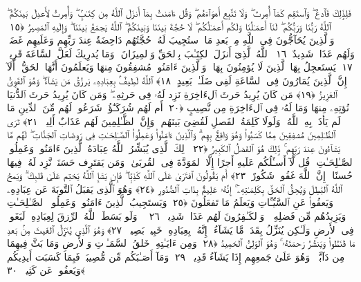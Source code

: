  فَلِذَٟلِكَ فَٱدعُ ۖ وَٱستَقِم كَمَآ أُمِرتَ ۖ وَلَا تَتَّبِع أَهوَآءَهُم ۖ وَقُل ءَامَنتُ بِمَآ أَنزَلَ ٱللَّهُ مِن كِتَـٰبٍۢ ۖ وَأُمِرتُ لِأَعدِلَ بَينَكُمُ ۖ ٱللَّهُ رَبُّنَا وَرَبُّكُم ۖ لَنَآ أَعمَـٰلُنَا وَلَكُم أَعمَـٰلُكُم ۖ لَا حُجَّةَ بَينَنَا وَبَينَكُمُ ۖ ٱللَّهُ يَجمَعُ بَينَنَا ۖ وَإِلَيهِ ٱلمَصِيرُ ﴿١٥﴾
 وَٱلَّذِينَ يُحَآجُّونَ فِى ٱللَّهِ مِنۢ بَعدِ مَا ٱستُجِيبَ لَهُۥ حُجَّتُهُم دَاحِضَةٌ عِندَ رَبِّهِم وَعَلَيهِم غَضَبٌۭ وَلَهُم عَذَابٌۭ شَدِيدٌ ﴿١٦﴾
 ٱللَّهُ ٱلَّذِىٓ أَنزَلَ ٱلكِتَـٰبَ بِٱلحَقِّ وَٱلمِيزَانَ ۗ وَمَا يُدرِيكَ لَعَلَّ ٱلسَّاعَةَ قَرِيبٌۭ ﴿١٧﴾
 يَستَعجِلُ بِهَا ٱلَّذِينَ لَا يُؤمِنُونَ بِهَا ۖ وَٱلَّذِينَ ءَامَنُوا۟ مُشفِقُونَ مِنهَا وَيَعلَمُونَ أَنَّهَا ٱلحَقُّ ۗ أَلَآ إِنَّ ٱلَّذِينَ يُمَارُونَ فِى ٱلسَّاعَةِ لَفِى ضَلَـٰلٍۭ بَعِيدٍ ﴿١٨﴾
 ٱللَّهُ لَطِيفٌۢ بِعِبَادِهِۦ يَرزُقُ مَن يَشَآءُ ۖ وَهُوَ ٱلقَوِىُّ ٱلعَزِيزُ ﴿١٩﴾
 مَن كَانَ يُرِيدُ حَرثَ ٱلءَاخِرَةِ نَزِد لَهُۥ فِى حَرثِهِۦ ۖ وَمَن كَانَ يُرِيدُ حَرثَ ٱلدُّنيَا نُؤتِهِۦ مِنهَا وَمَا لَهُۥ فِى ٱلءَاخِرَةِ مِن نَّصِيبٍ ﴿٢٠﴾
 أَم لَهُم شُرَكَـٰٓؤُا۟ شَرَعُوا۟ لَهُم مِّنَ ٱلدِّينِ مَا لَم يَأذَنۢ بِهِ ٱللَّهُ ۚ وَلَولَا كَلِمَةُ ٱلفَصلِ لَقُضِىَ بَينَهُم ۗ وَإِنَّ ٱلظَّـٰلِمِينَ لَهُم عَذَابٌ أَلِيمٌۭ ﴿٢١﴾
 تَرَى ٱلظَّـٰلِمِينَ مُشفِقِينَ مِمَّا كَسَبُوا۟ وَهُوَ وَاقِعٌۢ بِهِم ۗ وَٱلَّذِينَ ءَامَنُوا۟ وَعَمِلُوا۟ ٱلصَّـٰلِحَـٰتِ فِى رَوضَاتِ ٱلجَنَّاتِ ۖ لَهُم مَّا يَشَآءُونَ عِندَ رَبِّهِم ۚ ذَٟلِكَ هُوَ ٱلفَضلُ ٱلكَبِيرُ ﴿٢٢﴾
 ذَٟلِكَ ٱلَّذِى يُبَشِّرُ ٱللَّهُ عِبَادَهُ ٱلَّذِينَ ءَامَنُوا۟ وَعَمِلُوا۟ ٱلصَّـٰلِحَـٰتِ ۗ قُل لَّآ أَسـَٔلُكُم عَلَيهِ أَجرًا إِلَّا ٱلمَوَدَّةَ فِى ٱلقُربَىٰ ۗ وَمَن يَقتَرِف حَسَنَةًۭ نَّزِد لَهُۥ فِيهَا حُسنًا ۚ إِنَّ ٱللَّهَ غَفُورٌۭ شَكُورٌ ﴿٢٣﴾
 أَم يَقُولُونَ ٱفتَرَىٰ عَلَى ٱللَّهِ كَذِبًۭا ۖ فَإِن يَشَإِ ٱللَّهُ يَختِم عَلَىٰ قَلبِكَ ۗ وَيَمحُ ٱللَّهُ ٱلبَٰطِلَ وَيُحِقُّ ٱلحَقَّ بِكَلِمَـٰتِهِۦٓ ۚ إِنَّهُۥ عَلِيمٌۢ بِذَاتِ ٱلصُّدُورِ ﴿٢٤﴾
 وَهُوَ ٱلَّذِى يَقبَلُ ٱلتَّوبَةَ عَن عِبَادِهِۦ وَيَعفُوا۟ عَنِ ٱلسَّيِّـَٔاتِ وَيَعلَمُ مَا تَفعَلُونَ ﴿٢٥﴾
 وَيَستَجِيبُ ٱلَّذِينَ ءَامَنُوا۟ وَعَمِلُوا۟ ٱلصَّـٰلِحَـٰتِ وَيَزِيدُهُم مِّن فَضلِهِۦ ۚ وَٱلكَـٰفِرُونَ لَهُم عَذَابٌۭ شَدِيدٌۭ ﴿٢٦﴾
 ۞ وَلَو بَسَطَ ٱللَّهُ ٱلرِّزقَ لِعِبَادِهِۦ لَبَغَوا۟ فِى ٱلأَرضِ وَلَـٰكِن يُنَزِّلُ بِقَدَرٍۢ مَّا يَشَآءُ ۚ إِنَّهُۥ بِعِبَادِهِۦ خَبِيرٌۢ بَصِيرٌۭ ﴿٢٧﴾
 وَهُوَ ٱلَّذِى يُنَزِّلُ ٱلغَيثَ مِنۢ بَعدِ مَا قَنَطُوا۟ وَيَنشُرُ رَحمَتَهُۥ ۚ وَهُوَ ٱلوَلِىُّ ٱلحَمِيدُ ﴿٢٨﴾
 وَمِن ءَايَـٰتِهِۦ خَلقُ ٱلسَّمَـٰوَٟتِ وَٱلأَرضِ وَمَا بَثَّ فِيهِمَا مِن دَآبَّةٍۢ ۚ وَهُوَ عَلَىٰ جَمعِهِم إِذَا يَشَآءُ قَدِيرٌۭ ﴿٢٩﴾
 وَمَآ أَصَـٰبَكُم مِّن مُّصِيبَةٍۢ فَبِمَا كَسَبَت أَيدِيكُم وَيَعفُوا۟ عَن كَثِيرٍۢ ﴿٣٠﴾
